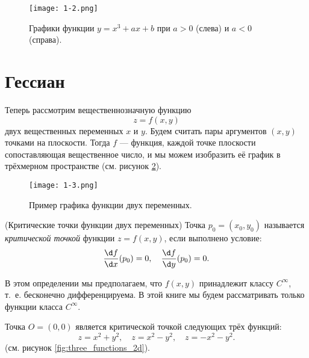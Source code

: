 \documentclass[a4paper,12pt,openany,leqno]{extbook}
\begin{document}
    \begin{figure}[ht]
    \texttt{[image: 1-2.png]}
    \caption{Графики функции $y = x^3 + ax + b$ при $a > 0$ (слева) и $a < 0$ (справа).}
    \label{fig:cubic_function}
    \end{figure}
    
    \section{Гессиан}
    
    Теперь рассмотрим вещественнозначную функцию
    \begin{equation}
    z = f(x, y)
    \label{eq:z_function}
    \end{equation}
    двух вещественных переменных $x$ и $y$. Будем считать пары аргументов $(x, y)$ точками на плоскости. Тогда $f$ --- функция, каждой точке плоскости сопоставляющая вещественное число, и мы можем изобразить её график в трёхмерном пространстве (см. рисунок \ref{fig:3d_function_graph}).
    
    \begin{figure}[ht]
    \texttt{[image: 1-3.png]}
    \caption{Пример графика функции двух переменных.}
    \label{fig:3d_function_graph}
    \end{figure}
    
    \begin{definition} (Критические точки функции двух переменных)
    Точка $p_0 = (x_0, y_0)$ называется \emph{критической точкой} функции $z = f(x, y)$, если выполнено условие:
    \begin{equation}
    \frac{\d f}{\d x}(p_0) = 0,\quad \frac{\d f}{\d y}(p_0) = 0.
    \label{eq:crit_point_2d}
    \end{equation}
    \label{def:crit_point_2d}
    \end{definition}
    
    В этом определении мы предполагаем, что $f(x, y)$ принадлежит классу $C^{\infty}$, т.~е. бесконечно дифференцируема. В этой книге мы будем рассматривать только функции класса $C^{\infty}$.
    
    \begin{example}
    Точка $O = (0, 0)$ является критической точкой следующих трёх функций:
    \begin{equation}
    z = x^2 + y^2,\quad z = x^2 - y^2,\quad z = -x^2 - y^2.
    \label{eq:three_functions_2d}
    \end{equation}
    (см. рисунок \ref{fig:three_functions_2d}).
    \label{exam:three_functions_2d}
    \end{example}
    
\end{document}
